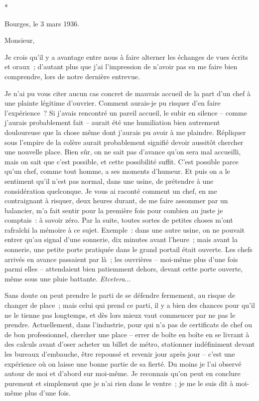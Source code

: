 \documentclass[french,twoside]{book} %
\begin{document}
\begin{center}
*\end{center}
\noindent Bourges, le 3 mars 1936.\par
\noindent Monsieur,\par
\par
Je crois qu'il y a avantage entre nous à faire alterner les échanges de vues écrits et oraux ; d'autant plus que j'ai l'impression de n'avoir pas su me faire bien comprendre, lors de notre dernière entrevue.\par
Je n'ai pu vous citer aucun cas concret de mauvais accueil de la part d'un chef à une plainte légitime d'ouvrier. Comment aurais-je pu risquer d'en faire l'expérience ? Si j'avais rencontré un pareil accueil, le subir en silence – comme j'aurais probablement fait – aurait été une humiliation bien autrement douloureuse que la chose même dont j'aurais pu avoir à me plaindre. Répliquer sous l'empire de la colère aurait probablement signifié devoir aussitôt chercher une nouvelle place. Bien sûr, on ne sait pas d'avance qu'on sera mal accueilli, mais on sait que c'est possible, et cette possibilité suffit. C'est possible parce qu'un chef, comme tout homme, a ses moments d'humeur. Et puis on a le sentiment qu'il n'est pas normal, dans une usine, de prétendre à une considération quelconque. Je vous ai raconté comment un chef, en me contraignant à risquer, deux heures durant, de me faire assommer par un balancier, m'a fait sentir pour la première fois pour combien au juste je comptais : à savoir zéro. Par la suite, toutes sortes de petites choses m'ont rafraîchi la mémoire à ce sujet. Exemple : dans une autre usine, on ne pouvait entrer qu'au signal d'une sonnerie, dix minutes avant l'heure ; mais avant la sonnerie, une petite porte pratiquée dans le grand portail était ouverte. Les chefs arrivés en avance passaient par là ; les ouvrières – moi-même plus d'une fois parmi elles – attendaient bien patiemment dehors, devant cette porte ouverte, même sous une pluie battante. {\itshape Etcetera}...\par
Sans doute on peut prendre le parti de se défendre fermement, au risque de changer de place ; mais celui qui prend ce parti, il y a bien des chances pour qu'il ne le tienne pas longtemps, et dès lors mieux vaut commencer par ne pas le prendre. Actuellement, dans l'industrie, pour qui n'a pas de certificats de chef ou de bon professionnel, chercher une place – errer de boîte en boîte en se livrant à des calculs avant d'oser acheter un billet de métro, stationner indéfiniment devant les bureaux d'embauche, être repoussé et revenir jour après jour – c'est une expérience où on laisse une bonne partie de sa fierté. Du moins je l'ai observé autour de moi et d'abord sur moi-même. Je reconnais qu'on peut en conclure purement et simplement que je n'ai rien dans le ventre ; je me le suis dit à moi-même plus d'une fois.\par
\end{document}
